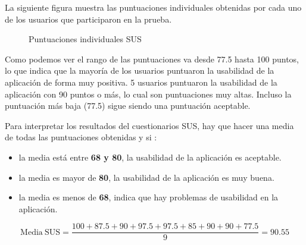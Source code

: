 La siguiente figura muestra las puntuaciones individuales obtenidas por cada uno de los usuarios que participaron en la prueba. 

\begin{figure}[H]
    \centering
    \caption{Puntuaciones individuales SUS}
\end{figure}

Como podemos ver el rango de las puntuaciones va desde 77.5 hasta 100 puntos, lo que indica que la mayoría de los usuarios puntuaron la usabilidad de la aplicación de forma muy positiva.
5 usuarios puntuaron la usabilidad de la aplicación con 90 puntos o más, lo cual son puntuaciones muy altas. Incluso la puntuación más 
baja (77.5) sigue siendo una puntuación aceptable.

Para interpretar los resultados del cuestionarios SUS, hay que hacer una media de todas las puntuaciones obtenidas y si :

\begin{itemize}
    \item la media está entre \textbf{68 y 80}, la usabilidad de la aplicación es aceptable.
    \item la media es mayor de \textbf{80}, la usabilidad de la aplicación es muy buena.
    \item la media es menos de \textbf{68}, indica que hay problemas de usabilidad en la aplicación.
\end{itemize}

\[
\mathrm{Media\ SUS} = \frac{100 + 87.5 + 90 + 97.5 + 97.5 + 85 + 90 + 90 + 77.5 }{9} = 90.55 
\]



